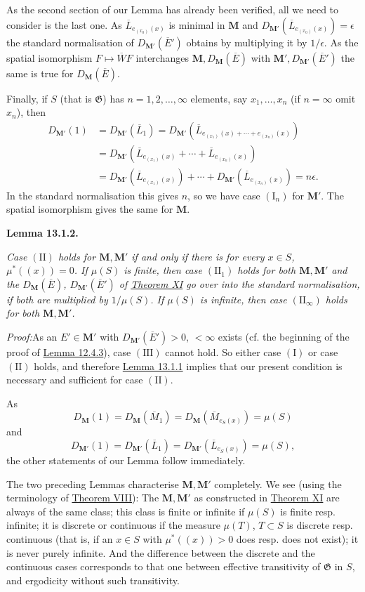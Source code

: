 \documentclass[12pt,b5paper,twoside]{article}
\newcommand{\M}{\mathbf M}
\newcommand{\Lemma}[1]{%
  \par\smallskip\noindent\phantomsection\label{lem:#1}\textbf{Lemma #1.}\enspace
}
\newcommand{\Proof}{\par\noindent\textit{Proof:}\enspace}
\newcommand{\lemref}[1]{\hyperref[lem:#1]{Lemma #1}}
\newcommand{\thmref}[1]{\hyperref[thm:#1]{Theorem #1}}
\begin{document}
As the second section of our Lemma has already been verified, all we need to
consider is the last one. As $\overline L_{e_{(x_0)}(x)}$ is minimal in $\M$
and $D_{\M'}(\overline L_{e_{(x_0)}(x)})=\epsilon$ the standard
normalisation of $D_{\M'}(\overline E')$ obtains by multiplying it by
$1/\epsilon$. As the spatial isomorphism $F\mapsto\overline WF$ interchanges
$\M,D_\M(\overline E)$ with $\M',D_{\M'}(\overline E')$ the same is true for
$D_\M(\overline E)$.

Finally, if $S$ (that is $\mathfrak G$) has $n=1,2,\ldots,\infty$ elements,
say $x_1,\ldots,x_n$ (if $n=\infty$ omit $x_n$), then
\begin{align*}
 D_{\M'}(1)&=D_{\M'}(\overline L_1)
 =D_{\M'}(\overline L_{e_{(x_1)}(x)+\cdots+e_{(x_n)}(x)})\\
 &=D_{\M'}(\overline L_{e_{(x_1)}(x)}+\cdots+
              \overline L_{e_{(x_n)}(x)})\\
 &=D_{\M'}(\overline L_{e_{(x_1)}(x)})+\cdots+
   D_{\M'}(\overline L_{e_{(x_n)}(x)})=n\epsilon.
\end{align*}
In the standard normalisation this gives $n$, so we have case
$(\mathrm I_n)$ for $\M'$. The spatial isomorphism gives the same for $\M$.

\Lemma{13.1.2}
\emph{Case $(\mathrm{II})$ holds for $\M,\M'$ if and only if there is for
every $x\in S$, $\mu^*((x))=0$. If $\mu(S)$ is finite, then case
$(\mathrm{II}_1)$ holds for both $\M,\M'$ and the
$D_\M(\overline E)$, $D_{\M'}(\overline E')$ of \thmref{XI} go over into the
standard normalisation, if both are multiplied by $1/\mu(S)$. If $\mu(S)$ is
infinite, then case $(\mathrm{II}_\infty)$ holds for both $\M,\M'$.}

\Proof As an $E'\in\M'$ with $D_{\M'}(\overline E')>0$, $<\infty$ exists
(cf. the beginning of the proof of \lemref{12.4.3}), case $(\mathrm{III})$
cannot hold. So either case $(\mathrm I)$ or case $(\mathrm{II})$ holds, and
therefore \lemref{13.1.1} implies that our present condition is necessary and
sufficient for case $(\mathrm{II})$.

As
\[
 D_\M(1)=D_\M(\overline M_1)=D_\M(\overline M_{e_S(x)})=\mu(S)
\]
and
\[
 D_{\M'}(1)=D_{\M'}(\overline L_1)
 =D_{\M'}(\overline L_{e_S(x)})=\mu(S),
\]
the other statements of our Lemma follow immediately.

The two preceding Lemmas characterise $\M,\M'$ completely. We see (using
the terminology of \thmref{VIII}): The $\M,\M'$ as constructed in
\thmref{XI} are always of the same class; this class is finite or infinite if
$\mu(S)$ is finite resp. infinite; it is discrete or continuous if the measure
$\mu(T)$, $T\subset S$ is discrete resp. continuous (that is, if an $x\in S$
with $\mu^*((x))>0$ does resp. does not exist); it is never purely infinite.
And the difference between the discrete and the continuous cases corresponds
to that one between effective transitivity of $\mathfrak G$ in $S$, and
ergodicity without such transitivity.
\end{document}
